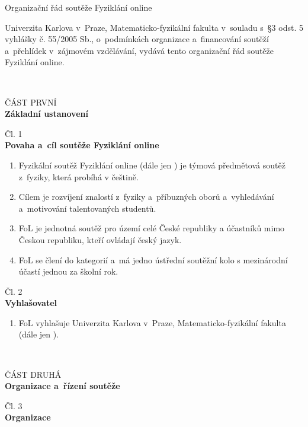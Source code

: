 \documentclass[a4paper,11pt,oneside]{article}
\begin{document}
\begin{center}
{\huge{Organizační řád soutěže Fyziklání online}}
\end{center}

Univerzita Karlova v~Praze, Matematicko-fyzikální fakulta v~souladu s~\S3 odst. 5 vyhlášky č. 55/2005 Sb., o~podmínkách organizace a~financování soutěží a~přehlídek v~zájmovém vzdělávání, vydává tento organizační řád soutěže Fyziklání online.

\hfill \\

\begin{center}
{\Large{ČÁST PRVNÍ}}\\
{\large{\bf{Základní ustanovení}}}
\end{center}
%
\begin{center}
{\Large{Čl. 1}}\\
\large{\bf{Povaha a~cíl soutěže Fyziklání online}}
\end{center}

\begin{enumerate}[(1)]
\item Fyzikální soutěž Fyziklání online (dále jen ) je týmová předmětová soutěž z~fyziky, která probíhá v češtině.

\item Cílem je rozvíjení znalostí z~fyziky a~příbuzných oborů a~vyhledávání a~motivování talentovaných studentů.

\item FoL je jednotná soutěž pro území celé České republiky a účastníků mimo Českou republiku, kteří ovládají český jazyk.

\item FoL se člení do kategorií a~má jedno ústřední soutěžní kolo s mezinárodní účastí jednou za školní rok.
\end{enumerate}


\begin{center}
{\Large{Čl. 2}}\\
\large{\bf{Vyhlašovatel}}
\end{center}

\begin{enumerate}[(1)]
\item FoL vyhlašuje Univerzita Karlova v~Praze, Matematicko-fyzikální fakulta  (dále jen ).
\end{enumerate}
%
\hfill \\
\begin{center}
{\Large{ČÁST DRUHÁ}}\\
{\large{\bf{Organizace a~řízení soutěže}}}
\end{center}
%
\begin{center}
{\Large{Čl. 3}}\\
\large{\bf{Organizace}}
\end{center}
\end{document}
